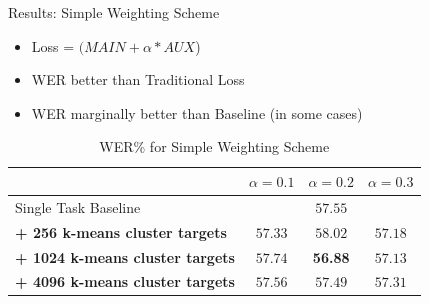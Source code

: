 \documentclass[final]{beamer} %
\begin{document}
\begin{frame}
\begin{columns}
\begin{column}{0.23\textwidth}
{          \vfill
          
        
        \begin{block}{\boxnumber Results: Simple Weighting Scheme}
          \begin{itemize}
          \item Loss = $(MAIN + \alpha*AUX$)
          \item WER better than Traditional Loss
          \item WER marginally better than Baseline (in some cases)
          \end{itemize}
        \end{block}        

        \vfill
        
        
        \begin{table}[!htbp]
          \centering
          \caption{WER\% for Simple Weighting Scheme}
          \begin{adjustbox}{width=\textwidth}
            \begin{tabular}{lccc}
              \toprule
              & $\alpha = 0.1 $ & $\alpha = 0.2 $ & $\alpha = 0.3 $\\
              \midrule
              Single Task Baseline  &  \multicolumn{3}{c}{$57.55$ \raisebox{.33\height}{\footnotesize{$\pm 1.82$}}}     \\
              
              \textbf{+ 256 k-means cluster targets}  &  $57.33$ \raisebox{.33\height}{\footnotesize{$\pm 2.49$}}   &  $58.02$ \raisebox{.33\height}{\footnotesize{$\pm 2.09$}}     & $57.18$ \raisebox{.33\height}{\footnotesize{$\pm 0.56$}} \\
              
              \textbf{+ 1024 k-means cluster targets}   & $ 57.74$ \raisebox{.33\height}{\footnotesize{$\pm 3.06$}}    & \textbf{56.88}  \raisebox{.33\height}{\footnotesize{$\pm 1.33$}}    & $57.13  $ \raisebox{.33\height}{\footnotesize{$\pm 1.55$}}  \\
              
              \textbf{+ 4096 k-means cluster targets}   &  $57.56$ \raisebox{.33\height}{\footnotesize{$\pm 2.53$}}  & $57.49$ \raisebox{.33\height}{\footnotesize{$\pm  3.17$}}   &  $57.31$ \raisebox{.33\height}{\footnotesize{$\pm 1.31$}}  \\
              \bottomrule
            \end{tabular}
          \end{adjustbox}
        \end{table}
        
}
\end{column}
\end{columns}
\end{frame}
\end{document}
